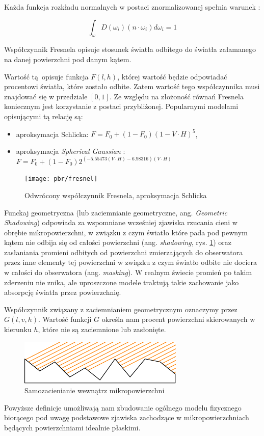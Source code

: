 \documentclass[../main.tex]{subfiles}
\begin{document}
Każda funkcja rozkładu normalnych w postaci znormalizowanej spełnia warunek
\cite{NDFReed}:

\[
  \int_{\omega} {
    D(\omega_i)
    (n \cdot \omega_i)
    d \omega_i
  } = 1
\]

Współczynnik Fresnela opisuje stosunek światła odbitego do światła załamanego
na danej powierzchni pod danym kątem.

Wartość tą opisuje funkcja $F(l,h)$, której wartość będzie odpowiadać
procentowi światła, które zostało odbite. Zatem wartość tego współczynnika musi
znajdować się w przedziale $[0,1]$. Ze względu na złożoność równań Fresnela
koniecznym jest korzystanie z postaci przybliżonej. Popularnymi modelami
opisującymi tą relację są:

\begin{itemize}
\item aproksymacja Schlicka: $F = F_0 + (1 - F_0)(1-V \cdot H)^5$,
\item aproksymacja \textit{Spherical Gaussian} \cite{SphericalGaussianLegarde}:
  $ F = F_0 +(1−F_0) 2^{
    \left(−5.55473\left(V \cdot H\right)−6.98316\right) (V \cdot H)
  } $
\end{itemize}

\begin{figure}[ht]
  \centering
  \texttt{[image: pbr/fresnel]}
  \caption{Odwrócony współczynnik Fresnela, aproksymacja Schlicka}
\end{figure}

Funckaj geometryczna (lub zaciemnianie geometryczne, ang. \textit{Geometric
Shadowing}) odpowiada za wspomniane wcześniej zjawiska rzucania cieni w obrębie
mikropowierzchni, w związku z czym światło które pada pod pewnym kątem nie
odbija się od całości powierzchni (ang. \textit{shadowing}, rys.
\ref{fig:GeometricShadowing}) oraz zasłaniania promieni odbitych od powierzchni
zmierzających do obserwatora przez inne elementy tej powierzchni w związku z
czym światło odbite nie dociera w całości do obserwatora (ang.
\textit{masking}). W realnym świecie promień po takim zderzeniu nie znika, ale
uproszczone modele traktują takie zachowanie jako absorpcję światła przez
powierzchnię.

Współczynnik związany z zaciemnianiem geometrycznym oznaczymy przez $G(l,v,h)$.
Wartość funkcji $G$ określa nam procent powierzchni skierowanych w kierunku
$h$, które nie są zaciemnione lub zasłonięte.

\begin{figure}[h]
  \centering
  \includegraphics{illustrations/pbr/geometry_shadowing.pdf}
  \vspace{0.25cm}
  \caption{Samozacienianie wewnątrz mikropowierzchni}
  \label{fig:GeometricShadowing}
\end{figure}

Powyższe definicje umożliwają nam zbudowanie ogólnego modelu fizycznego
biorącego pod uwagę podstawowe zjawiska zachodzące w mikropowierzchniach
będących powierzchniami idealnie płaskimi.

\end{document}
